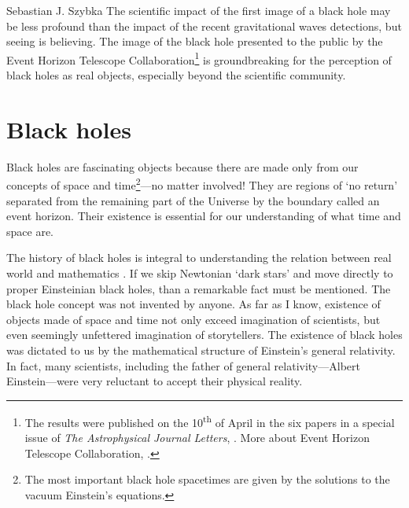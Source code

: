 \begin{artengenv}{Sebastian J. Szybka}
The scientific impact of the first image of a black hole may be less profound than the impact of the recent gravitational waves detections, but seeing is believing. The image of the black hole presented to the public by the Event Horizon Telescope Collaboration\footnote{The results were published on the 10\textsuperscript{th} of April in the six papers in a special issue of \textit{The Astrophysical Journal Letters}, \parencite[see e.g.][]{the_event_horizon_telescope_collaboration_first_2019}. More about Event Horizon Telescope Collaboration, \parencite[see][]{noauthor_event_nodate}.} is groundbreaking for the perception of black holes as real objects, especially beyond the scientific community. 

\section{Black holes}

Black holes are fascinating objects because there are made only from our concepts of space and time\footnote{The most important black hole spacetimes are given by the solutions to the vacuum Einstein's equations.}---no matter involved! They are regions of `no return' separated from the remaining part of the Universe by the boundary called an event horizon. Their existence is essential for our understanding of what time and space are. 

The history of black holes is integral to understanding the relation between real world and mathematics \parencite{malec_black_2018}. If we skip Newtonian `dark stars' and move directly to proper Einsteinian black holes, than a remarkable fact must be mentioned. The black hole concept was not invented by anyone. As far as I know, existence of objects made of space and time not only exceed imagination of scientists, but even seemingly unfettered imagination of storytellers. The existence of black holes was dictated to us by the mathematical structure of Einstein's general relativity. In fact, many scientists, including the father of general relativity---Albert Einstein---were very reluctant to accept their physical reality.


\end{artengenv}
